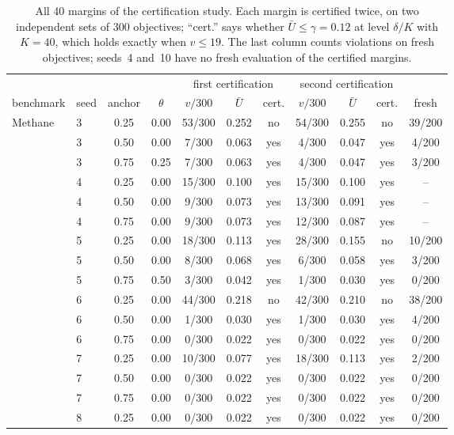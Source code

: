 \begin{table}[p]
\centering
\scriptsize
\caption{All 40 margins of the certification study. Each margin is certified twice,
on two independent sets of 300 objectives; ``cert.'' says whether $\bar U\le\gamma=0.12$
at level $\delta/K$ with $K=40$, which holds exactly when $v\le 19$. The last column
counts violations on fresh objectives; seeds~4 and~10 have no fresh evaluation of
the certified margins.}
\label{tab:cert-all}
\begin{tabular}{llcc ccc ccc c}
\toprule
 & & & & \multicolumn{3}{c}{first certification} & \multicolumn{3}{c}{second certification} & \\
\cmidrule(lr){5-7}\cmidrule(lr){8-10}
benchmark & seed & anchor & $\theta$ & $v/300$ & $\bar U$ & cert. & $v/300$ & $\bar U$ & cert. & fresh \\
\midrule
Methane & 3 & 0.25 & 0.00 & 53/300 & 0.252 & no & 54/300 & 0.255 & no & 39/200 \\
 & 3 & 0.50 & 0.00 & 7/300 & 0.063 & yes & 4/300 & 0.047 & yes & 4/200 \\
 & 3 & 0.75 & 0.25 & 7/300 & 0.063 & yes & 4/300 & 0.047 & yes & 3/200 \\
 & 4 & 0.25 & 0.00 & 15/300 & 0.100 & yes & 15/300 & 0.100 & yes & -- \\
 & 4 & 0.50 & 0.00 & 9/300 & 0.073 & yes & 13/300 & 0.091 & yes & -- \\
 & 4 & 0.75 & 0.00 & 9/300 & 0.073 & yes & 12/300 & 0.087 & yes & -- \\
 & 5 & 0.25 & 0.00 & 18/300 & 0.113 & yes & 28/300 & 0.155 & no & 10/200 \\
 & 5 & 0.50 & 0.00 & 8/300 & 0.068 & yes & 6/300 & 0.058 & yes & 3/200 \\
 & 5 & 0.75 & 0.50 & 3/300 & 0.042 & yes & 1/300 & 0.030 & yes & 0/200 \\
 & 6 & 0.25 & 0.00 & 44/300 & 0.218 & no & 42/300 & 0.210 & no & 38/200 \\
 & 6 & 0.50 & 0.00 & 1/300 & 0.030 & yes & 1/300 & 0.030 & yes & 4/200 \\
 & 6 & 0.75 & 0.00 & 0/300 & 0.022 & yes & 0/300 & 0.022 & yes & 0/200 \\
 & 7 & 0.25 & 0.00 & 10/300 & 0.077 & yes & 18/300 & 0.113 & yes & 2/200 \\
 & 7 & 0.50 & 0.00 & 0/300 & 0.022 & yes & 0/300 & 0.022 & yes & 0/200 \\
 & 7 & 0.75 & 0.00 & 0/300 & 0.022 & yes & 0/300 & 0.022 & yes & 0/200 \\
 & 8 & 0.25 & 0.00 & 0/300 & 0.022 & yes & 0/300 & 0.022 & yes & 0/200 \\

\end{tabular}
\end{table}
